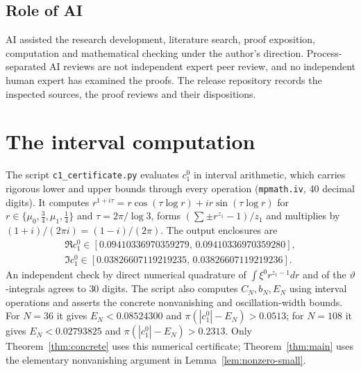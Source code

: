 \documentclass[11pt]{article}
\theoremstyle{definition}
\theoremstyle{remark}
\begin{document}
\subsection*{Role of AI}
AI assisted the research development, literature search, proof exposition,
computation and mathematical checking under the author's direction.
Process-separated AI reviews are not independent expert peer review, and no
independent human expert has examined the proofs. The release repository
records the inspected sources, the proof reviews and their dispositions.

\appendix
\section{The interval computation}\label{app:certificate}
The script \texttt{c1\_certificate.py} evaluates $c_1^0$ in interval
arithmetic, which carries rigorous lower and upper bounds through every
operation (\texttt{mpmath.iv}, 40 decimal digits). It
computes $r^{1+i\tau}=r\cos(\tau\log r)+ir\sin(\tau\log r)$ for
$r\in\{\mu_0,\frac34,\mu_1,\frac14\}$ and $\tau=2\pi/\log3$, forms
$(\sum\pm r^{z_1}-1)/z_1$ and multiplies by $(1+i)/(2\pi i)=(1-i)/(2\pi)$. The
output enclosures are
\begin{gather*}
 \Re c_1^0\in[0.09410336970359279,\,0.09410336970359280],\\
 \Im c_1^0\in[0.03826607119219235,\,0.03826607119219236].
\end{gather*}
An independent check by direct numerical quadrature of
$\int\xi^0r^{z_1-1}dr$ and of the $\vartheta$-integrals agrees to $30$
digits. The script also computes $C_N,b_N,E_N$ using interval operations and
asserts the concrete nonvanishing and oscillation-width bounds. For
$N=36$ it gives $E_N<0.08524300$ and
$\pi(|c_1^0|-E_N)>0.0513$; for $N=108$ it gives
$E_N<0.02793825$ and $\pi(|c_1^0|-E_N)>0.2313$.
Only Theorem~\ref{thm:concrete} uses this numerical certificate;
Theorem~\ref{thm:main} uses the elementary nonvanishing argument in
Lemma~\ref{lem:nonzero-small}.
\end{document}
